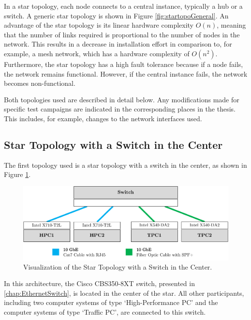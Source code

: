 In a star topology, each node connects to a central instance, typically a hub or a switch. A generic star topology is shown in Figure \ref{fig:startopoGeneral}. An advantage of the star topology is its linear hardware complexity $O(n)$, meaning that the number of links required is proportional to the number of nodes in the network. This results in a decrease in installation effort in comparison to, for example, a mesh network, which has a hardware complexity of $O(n^2)$. Furthermore, the star topology has a high fault tolerance because if a node fails, the network remains functional. However, if the central instance fails, the network becomes non-functional.

Both topologies used are described in detail below. Any modifications made for specific test campaigns are indicated in the corresponding places in the thesis. This includes, for example, changes to the network interfaces used.

\subsection{Star Topology with a Switch in the Center} \label{chap:TopoSwitch}

The first topology used is a star topology with a switch in the center, as shown in Figure \ref{fig:startopoSwitch}.

\begin{figure}[h!]
    \centering
    \includegraphics[width=1\linewidth]{figures/method/topo2.pdf}
    \caption[Visualization of the Star Topology with a Switch in the Center]{Visualization of the Star Topology with a Switch in the Center.}
    \label{fig:startopoSwitch}
\end{figure}

In this architecture, the Cisco CBS350-8XT switch, presented in \ref{chap:EthernetSwitch}, is located in the center of the star. All other participants, including two computer systems of type `High-Performance PC' and the computer systems of type `Traffic PC', are connected to this switch.

